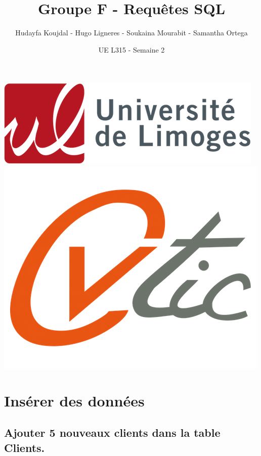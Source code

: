 \documentclass[12pt,a4paper]{article}
\title{Groupe F - Requêtes SQL}
\author{Hudayfa Koujdal - Hugo Ligneres - Soukaina Mourabit - Samantha Ortega}
\date{UE L315 - Semaine 2}
\begin{document}
\maketitle

\hrulefill
\vspace{6cm}
\begin{center}
	\includegraphics[scale=.4]{../images/univ.png}
		\\
		\vspace{2cm}
	\includegraphics[scale=.25]{../images/cvtic.png}
\end{center}

\newpage

\tableofcontents

\newpage

\section{Insérer des données}


	\subsection{Ajouter 5 nouveaux clients dans la table Clients. }
	
\end{document}
